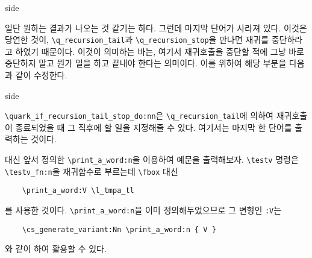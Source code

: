 \documentclass[a4paper]{oblivoir}
\begin{document}

\begin{mylistingtext}{side}
\end{mylistingtext}

일단 원하는 결과가 나오는 것 같기는 하다. 그런데 마지막 단어가 사라져 있다. 이것은 당연한 것이, \verb|\q_recursion_tail|과 
\verb|\q_recursion_stop|을 만나면 재귀를 중단하라고 하였기 때문이다. 이것이 의미하는 바는, 여기서 재귀호출을 중단할 적에 
그냥 바로 중단하지 말고 뭔가 일을 하고 끝내야 한다는 의미이다. 이를 위하여 해당 부분을 다음과 같이 수정한다.


\begin{mylistingtext}{side}
\end{mylistingtext}

\verb|\quark_if_recursion_tail_stop_do:nn|은 \verb|\q_recursion_tail|에 의하여 재귀호출이 종료되었을 때
그 직후에 할 일을 지정해줄 수 있다. 여기서는 마지막 한 단어를 출력하는 것이다.

 대신 앞서 정의한 \verb|\print_a_word:n|을 이용하여 예문을 출력해보자. 
\verb|\testv| 명령은 \verb|\testv_fn:n|을 재귀함수로 부르는데 \verb|\fbox| 대신 
\begin{verbatim}
    \print_a_word:V \l_tmpa_tl 
\end{verbatim}
를 사용한 것이다. \verb|\print_a_word:n|을 이미 정의해두었으므로 그 변형인 \verb|:V|는 
\begin{verbatim}
    \cs_generate_variant:Nn \print_a_word:n { V }
\end{verbatim}
와 같이 하여 활용할 수 있다.
\end{document}
